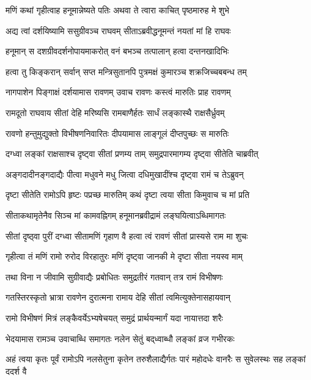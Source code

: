 \twolineshloka
{मणिं कथां गृहीत्वाह हनूमान्नेष्यते पतिः }
{अथवा ते त्वारा काचित् पृष्ठमारुह मे शुभे}%

\twolineshloka
{अद्य त्वां दर्शयिष्यामि ससुग्रीवञ्च राघवम् }
{सीताऽब्रवीद्धनूमन्तं नयतां मां हि राघवः}%

\twolineshloka
{हनूमान् स दशग्रीवदर्शनोपायमाकरोत्}
{वनं बभञ्च तत्पालान् हत्वा दन्तनखादिभिः}%

\twolineshloka
{हत्वा तु किङ्करान् सर्वान् सप्त मन्त्रिसुतानपि}
{पुत्रमक्षं कुमारञ्च शक्रजिच्चबबन्ध तम्}%

\twolineshloka
{नागपाशेन पिङ्गाक्षं दर्शयामास रावणम्}
{उवाच रावणः कस्त्वं मारुतिः प्राह रावणम्}%

\twolineshloka
{रामदूतो राघवाय सीतां देहि मरिष्यसि}
{रामबाणैर्हतः सार्धं लङ्कास्थै राक्षसैर्ध्रुवम्}%

\twolineshloka
{रावणो हन्तुमुद्युक्तो विभीषणनिवारितः}
{दीपयामास लाङ्गूलं दीप्तपुच्छः स मारुतिः}%

\twolineshloka
{दग्ध्वा लङ्कां राक्षसाश्च दृष्ट्वा सीतां प्रणम्य ताम्}
{समुद्रपारमागम्य दृष्ट्वा सीतेति चाब्रवीत्}%

\twolineshloka
{अङ्गदादीनङ्गदाद्यैः पीत्वा मधुवने मधु}
{जित्वा दधिमुखादींश्च दृष्ट्वा रामं च तेऽब्रुवन्}%

\twolineshloka
{दृष्टा सीतेति रामोऽपि हृष्टः पप्रच्छ मारुतिम्}
{कथं दृष्टा त्वया सीता किमुवाच च मां प्रति}%

\twolineshloka
{सीताकथामृतेनैव सिञ्च मां कामवह्निगम्}
{हनूमानब्रवीद्रामं लङ्घयित्वाऽब्धिमागतः}%

\twolineshloka
{सीतां दृष्ठ्वा पुरीं दग्ध्वा सीतामणिं गृहाण वै}
{हत्वा त्वं रावणं सीतां प्रास्यसे राम मा शुचः}%

\twolineshloka
{गृहीत्वा तं मणिं रामो रुरोद विरहातुरः }
{मणिं दृष्ट्वा जानकी मे दृष्टा सीता नयस्व माम्}%

\twolineshloka
{तथा विना न जीवामि सुग्रीवाद्यैः प्रबोधितः}
{समुद्रतीरं गतवान् तत्र रामं विभीषणः}%

\twolineshloka
{गतस्तिरस्कृतो भ्रात्रा रावणेन दुरात्मना}
{रामाय देहि सीतां त्वमित्युक्तेनासहायवान्}%

\twolineshloka
{रामो विभीषणं मित्रं लङ्कैवर्येऽभ्यषेचयत्}
{समुद्रं प्रार्थयन्मार्गं यदा नायात्तदा शरैः}%

\twolineshloka
{भेदयामास रामञ्च उवाचाब्धि समागतः}
{नलेन सेतुं बद्‌ध्वाब्धौ लङ्कां व्रज गभीरकः}%

\threelineshloka
{अहं त्वया कृतः पूर्वं रामोऽपि नलसेतुना}
{कृतेन तरुशैलाद्यैर्गतः पारं महोदधेः}
{वानरैः स सुवेलस्थः सह लङ्कां ददर्श वै} %

